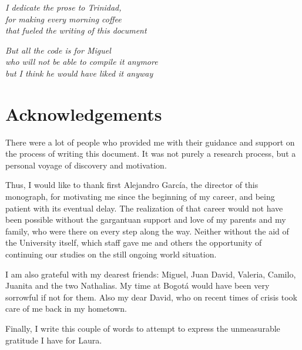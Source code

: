 \documentclass[12pt,letterpaper,oneside]{book}
\begin{document}
\newpage

\begin{flushright}
	\textit{
		I dedicate the prose to Trinidad,        \\
		for making every morning coffee          \\ 
		that fueled the writing of this document
	}

	\vspace{5mm}

	\textit{
		But all the code is for Miguel             \\
		who will not be able to compile it anymore \\ 
		but I think he would have liked it anyway
	}
\end{flushright}

\vspace{2mm}

\chapter*{Acknowledgements}

There were a lot of people who provided me with their guidance and support on the process of writing this document. 
It was not purely a research process, but a personal voyage of discovery and motivation. 

Thus, I would like to thank first Alejandro García, the director of this monograph, 
for motivating me since the beginning of my career, and being patient with its eventual delay. 
The realization of that career would not have been possible without the gargantuan support and love of my parents and my family, 
who were there on every step along the way.
Neither without the aid of the University itself, which staff gave me and others%
the opportunity of continuing our studies on the still ongoing world situation.

I am also grateful with my dearest friends: Miguel, Juan David, Valeria, Camilo, Juanita and the two Nathalias. 
My time at Bogotá would have been very sorrowful if not for them. 
Also my dear David, who on recent times of crisis took care of me back in my hometown.

Finally, I write this couple of words to attempt to express the unmeasurable gratitude I have for Laura.

\mainmatter

\tableofcontents

\newpage

\listoffigures
\listoftables
\listoflistings
\end{document}
